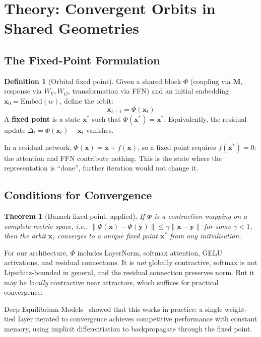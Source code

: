 \documentclass[11pt, a4paper]{article}
\newcommand{\M}{\mathbf{M}}
\newcommand{\x}{\mathbf{x}}
\theoremstyle{plain}
\newtheorem{theorem}{Theorem}
\theoremstyle{definition}
\newtheorem{definition}{Definition}
\theoremstyle{remark}
\begin{document}
\section{Theory: Convergent Orbits in Shared Geometries}

\subsection{The Fixed-Point Formulation}

\begin{definition}[Orbital fixed point]
Given a shared block $\Phi$ (coupling via $\M$, response via $W_V, W_O$, transformation via FFN) and an initial embedding $\x_0 = \text{Embed}(w)$, define the orbit:
\[
    \x_{t+1} = \Phi(\x_t)
\]
A \textbf{fixed point} is a state $\x^*$ such that $\Phi(\x^*) = \x^*$.
Equivalently, the residual update $\Delta_t = \Phi(\x_t) - \x_t$ vanishes.
\end{definition}

In a residual network, $\Phi(\x) = \x + f(\x)$, so a fixed point requires $f(\x^*) = 0$: the attention and FFN contribute nothing.
This is the state where the representation is ``done'', further iteration would not change it.

\subsection{Conditions for Convergence}

\begin{theorem}[Banach fixed-point, applied]
If $\Phi$ is a contraction mapping on a complete metric space, i.e., $\|\Phi(\x) - \Phi(\mathbf{y})\| \leq \gamma \|\x - \mathbf{y}\|$ for some $\gamma < 1$, then the orbit $\x_t$ converges to a unique fixed point $\x^*$ from any initialisation.
\end{theorem}

For our architecture, $\Phi$ includes LayerNorm, softmax attention, GELU activations, and residual connections.
It is \emph{not} globally contractive, softmax is not Lipschitz-bounded in general, and the residual connection preserves norm.
But it may be \emph{locally} contractive near attractors, which suffices for practical convergence.

Deep Equilibrium Models~\cite{bai2019deep} showed that this works in practice: a single weight-tied layer iterated to convergence achieves competitive performance with constant memory, using implicit differentiation to backpropagate through the fixed point.
\end{document}
